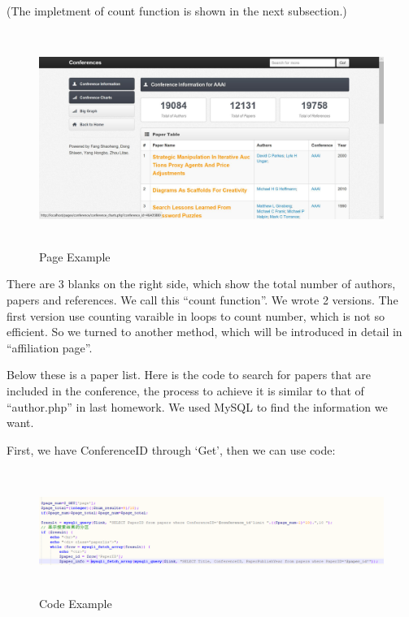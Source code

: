 \documentclass{book}
\begin{document}
(The impletment of count function is shown in the next subsection.)
\begin{figure}[H]
\centering
\includegraphics[height=7.0cm,width=16.0cm]{img/yhb_con_2.jpg}
\caption{Page Example}
\end{figure}
There are 3 blanks on the right side, which show the total number of authors, papers and references. We call this ``count function''. We wrote 2 versions. The first version use counting varaible in loops to count number, which is not  so efficient. So we turned to another method, which will be introduced in detail in ``affiliation page''.

Below these is a paper list.
Here is the code to search for papers that are included in the conference, the process to achieve  it is similar to that of ``author.php'' in last homework. We used MySQL to find the information we want. 

First, we have ConferenceID through `Get', then we can use code:
\begin{figure}[H]
\centering
\includegraphics[height=4.0cm,width=16.0cm]{img/yhb_con_11.png}
\caption{Code Example}
\end{figure}
\end{document}

